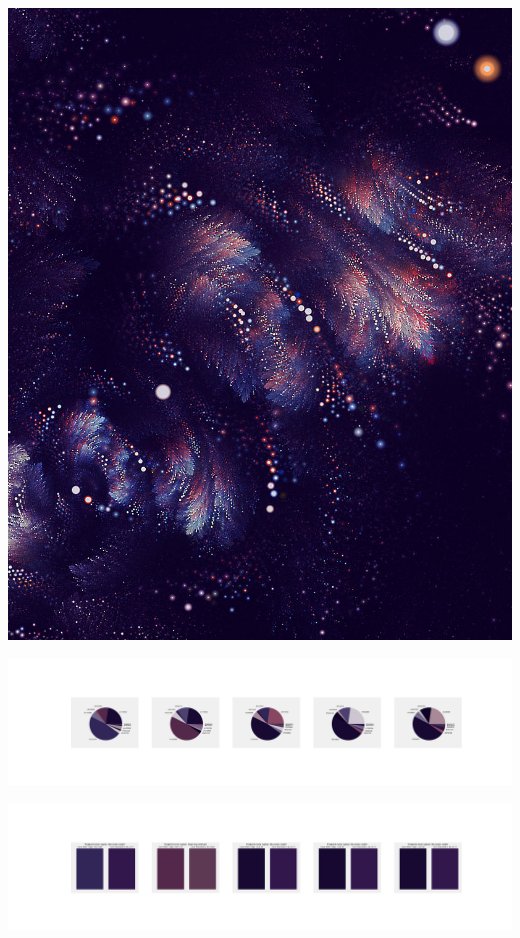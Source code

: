 \documentclass[11pt]{article}
\begin{document}
\begin{landscape}
    \begin{center}
    \includegraphics[width=\textwidth]{./nbimg/file (114).jpg}
    \end{center}

    \begin{center}
    \includegraphics[width=250mm]{./nbimg/pie-17.jpg}
    \end{center}

    \begin{center}
    \includegraphics[width=250mm]{./nbimg/peak-17.jpg}
    \end{center}
    


\end{landscape}
\end{document}
